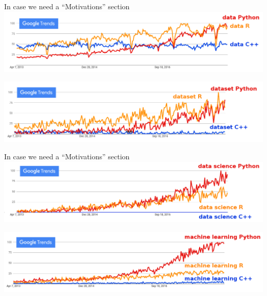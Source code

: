 \documentclass[aspectratio=169]{beamer}
\begin{document}
\begin{frame}{In case we need a ``Motivations'' section}
\vspace{0.5 cm}
\includegraphics[width=\linewidth]{python-r-cpp-googletrends-data.png}

\vspace{1 cm}
\includegraphics[width=\linewidth]{python-r-cpp-googletrends-dataset.png}
\end{frame}

\begin{frame}{In case we need a ``Motivations'' section}
\vspace{0.5 cm}
\includegraphics[width=\linewidth]{python-r-cpp-googletrends-datascience.png}

\vspace{1 cm}
\includegraphics[width=\linewidth]{python-r-cpp-googletrends-machinelearning.png}
\end{frame}

\end{document}
